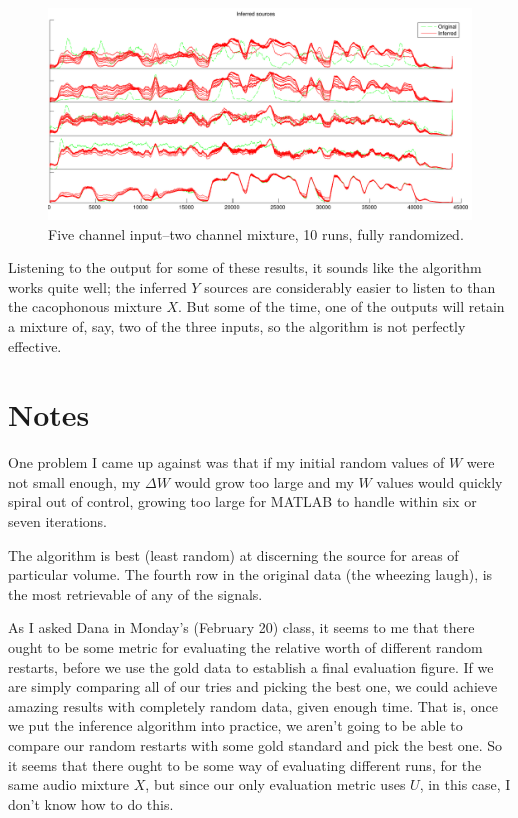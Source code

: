 \documentclass[11pt]{report}
\begin{document}
\begin{figure}[H]
  \centering
  \includegraphics[width=\textwidth]{../plots/5channels10-2mix.pdf}
  \caption{Five channel input--two channel mixture, 10 runs, fully randomized.}
  \label{fig:f}
\end{figure}
Listening to the output for some of these results, it sounds like the algorithm works quite well; the inferred $Y$ sources are considerably easier to listen to than the cacophonous mixture $X$. But some of the time, one of the outputs will retain a mixture of, say, two of the three inputs, so the algorithm is not perfectly effective.

\section{Notes}

One problem I came up against was that if my initial random values of $W$ were not small enough, my $\Delta W$ would grow too large and my $W$ values would quickly spiral out of control, growing too large for MATLAB to handle within six or seven iterations.

The algorithm is best (least random) at discerning the source for areas of particular volume. The fourth row in the original data (the wheezing laugh), is the most retrievable of any of the signals.

As I asked Dana in Monday's (February 20) class, it seems to me that there ought to be some metric for evaluating the relative worth of different random restarts, before we use the gold data to establish a final evaluation figure. If we are simply comparing all of our tries and picking the best one, we could achieve amazing results with completely random data, given enough time. That is, once we put the inference algorithm into practice, we aren't going to be able to compare our random restarts with some gold standard and pick the best one. So it seems that there ought to be some way of evaluating different runs, for the same audio mixture $X$, but since our only evaluation metric uses $U$, in this case, I don't know how to do this.
\end{document}
